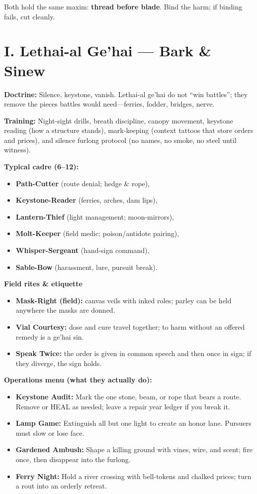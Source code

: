 \documentclass[11pt]{article}
\begin{document}
  Both hold the same maxim: \textbf{thread before blade}. Bind the harm; if binding fails, cut cleanly.
  
  \bigskip
  
  \section*{I. Lethai-al Ge'hai --- Bark \& Sinew}
  
  \textbf{Doctrine:} Silence, keystone, vanish. Lethai-al ge'hai do not ``win battles''; they remove the pieces battles would need---ferries, fodder, bridges, nerve.
  
  \textbf{Training:} Night-sight drills, breath discipline, canopy movement, keystone reading (how a structure stands), mark-keeping (context tattoos that store orders and prices), and silence furlong protocol (no names, no smoke, no steel until witness).
  
  \textbf{Typical cadre (6--12):}
  \begin{itemize}
  \item \textbf{Path-Cutter} (route denial; hedge \& rope),
  \item \textbf{Keystone-Reader} (ferries, arches, dam lips),
  \item \textbf{Lantern-Thief} (light management; moon-mirrors),
  \item \textbf{Molt-Keeper} (field medic; poison/antidote pairing),
  \item \textbf{Whisper-Sergeant} (hand-sign command),
  \item \textbf{Sable-Bow} (harassment, lure, pursuit break).
  \end{itemize}
  
  \textbf{Field rites \& etiquette}
  \begin{itemize}
  \item \textbf{Mask-Right (field):} canvas veils with inked roles; parley can be held anywhere the masks are donned.
  \item \textbf{Vial Courtesy:} dose and cure travel together; to harm without an offered remedy is a ge'hai sin.
  \item \textbf{Speak Twice:} the order is given in common speech and then once in sign; if they diverge, the sign holds.
  \end{itemize}
  
  \textbf{Operations menu (what they actually do):}
  \begin{itemize}
  \item \textbf{Keystone Audit:} Mark the one stone, beam, or rope that bears a route. Remove or HEAL as needed; leave a repair year ledger if you break it.
  \item \textbf{Lamp Game:} Extinguish all but one light to create an honor lane. Pursuers must slow or lose face.
  \item \textbf{Gardened Ambush:} Shape a killing ground with vines, wire, and scent; fire once, then disappear into the furlong.
  \item \textbf{Ferry Night:} Hold a river crossing with bell-tokens and chalked prices; turn a rout into an orderly retreat.
  \end{itemize}
  
\end{document}
